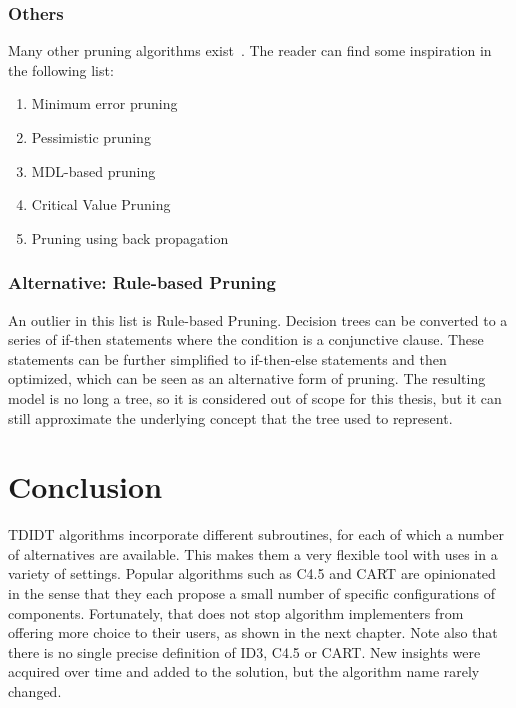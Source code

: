 \subsubsection{Others}
Many other pruning algorithms exist~\cite{mingers1989empirical, breslow1997simplifying, elomaa1999biases, esposito1997comparative}. The reader can find some inspiration in the following list:

\begin{enumerate}
    \item Minimum error pruning~\cite{niblett1986learning}
    \item Pessimistic pruning~\cite{mansour1997pessimistic, quinlan1987simplifying, c45}
    \item MDL-based pruning~\cite{mdlpruning, quinlan1989inferring}
    \item Critical Value Pruning~\cite{mingers1987rule}
    \item Pruning using back propagation~\cite{backproppruning}
\end{enumerate}

\subsubsection{Alternative: Rule-based Pruning}
An outlier in this list is Rule-based Pruning. Decision trees can be converted to a series of if-then statements where the condition is a conjunctive clause. These statements can be further simplified to if-then-else statements and then optimized, which can be seen as an alternative form of pruning. The resulting model is no long a tree, so it is considered out of scope for this thesis, but it can still approximate the underlying concept that the tree used to represent.

\section{Conclusion}
TDIDT algorithms incorporate different subroutines, for each of which a number of alternatives are available. This makes them a very flexible tool with uses in a variety of settings. Popular algorithms such as C4.5 and CART are opinionated in the sense that they each propose a small number of specific configurations of components. Fortunately, that does not stop algorithm implementers from offering more choice to their users, as shown in the next chapter. Note also that there is no single precise definition of ID3, C4.5 or CART. New insights were acquired over time and added to the solution, but the algorithm name rarely changed.